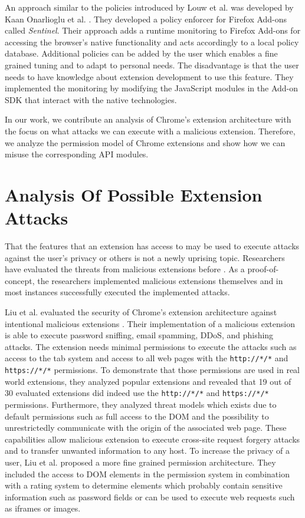 	An approach similar to the policies introduced by Louw et al. was developed by Kaan Onarlioglu et al. \cite{cs2015sentinel}. They developed a policy enforcer for Firefox Add-ons called \textit{Sentinel}. Their approach adds a runtime monitoring to Firefox Add-ons for accessing the browser's native functionality and acts accordingly to a local policy database. Additional policies can be added by the user which enables a fine grained tuning and to adapt to personal needs. The disadvantage is that the user needs to have knowledge about extension development to use this feature. They implemented the monitoring by modifying the JavaScript modules in the Add-on SDK that interact with the native technologies.  
	
	In our work, we contribute an analysis of Chrome's extension architecture with the focus on what attacks we can execute with a malicious extension. Therefore, we analyze the permission model of Chrome extensions and show how we can misuse the corresponding API modules.  %



\section{Analysis Of Possible Extension Attacks}

	That the features that an extension has access to may be used to execute attacks against the user's privacy or others is not a newly uprising topic. Researchers have evaluated the threats from malicious extensions before \cite{Liu12chromeextensions:, extensions:cns14}. As a proof-of-concept, the researchers implemented malicious extensions themselves and in most instances successfully executed the implemented attacks. 
	
	Liu et al. evaluated the security of Chrome's extension architecture against intentional malicious extensions \cite{Liu12chromeextensions:}. Their implementation of a malicious extension is able to execute password sniffing, email spamming, DDoS, and phishing attacks. The extension needs minimal permissions to execute the attacks such as access to the tab system and access to all web pages with the \texttt{http://*/*} and \texttt{https://*/*} permissions. To demonstrate that those permissions are used in real world extensions, they analyzed popular extensions and revealed that 19 out of 30 evaluated extensions did indeed use the \texttt{http://*/*} and \texttt{https://*/*} permissions. Furthermore, they analyzed threat models which exists due to default permissions such as full access to the DOM and the possibility to unrestrictedly communicate with the origin of the associated web page. These capabilities allow malicious extension to execute cross-site request forgery attacks and to transfer unwanted information to any host. To increase the privacy of a user, Liu et al. proposed a more fine grained permission architecture. They included the access to DOM elements in the permission system in combination with a rating system to determine elements which probably contain sensitive information such as password fields or can be used to execute web requests such as iframes or images. \\
	
